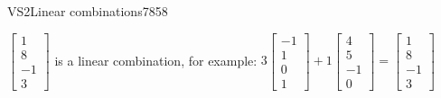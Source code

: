 \begin{exercise}{VS2}{Linear combinations}{7858}
\begin{exerciseAnswer}
\begin{itemize}
 

 \(\left[\begin{array}{c}
1 \\
8 \\
-1 \\
3
\end{array}\right]\) is a linear combination, for example: \(
3 \left[\begin{array}{c}
-1 \\
1 \\
0 \\
1
\end{array}\right] + 1 \left[\begin{array}{c}
4 \\
5 \\
-1 \\
0
\end{array}\right] = \left[\begin{array}{c}
1 \\
8 \\
-1 \\
3
\end{array}\right]
                            \) 

 
\end{itemize}

     \end{exerciseAnswer}
 \end{exercise}


